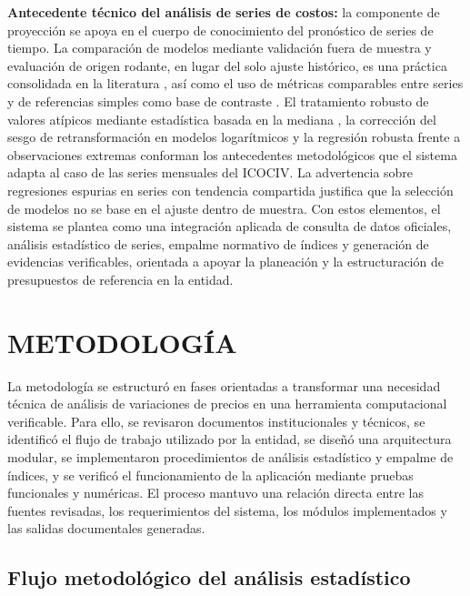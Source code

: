 \documentclass[12pt,letterpaper]{article}
\providecommand{\parencite}{\citep}
\newcommand{\ICOCIV}{ICOCIV}
\begin{document}
\textbf{Antecedente técnico del análisis de series de costos:} la componente de proyección se apoya en el cuerpo de conocimiento del pronóstico de series de tiempo. La comparación de modelos mediante validación fuera de muestra y evaluación de origen rodante, en lugar del solo ajuste histórico, es una práctica consolidada en la literatura \parencite{hyndman2021fpp3,tashman2000}, así como el uso de métricas comparables entre series y de referencias simples como base de contraste \parencite{hyndman_koehler2006}. El tratamiento robusto de valores atípicos mediante estadística basada en la mediana \parencite{nist_outliers}, la corrección del sesgo de retransformación en modelos logarítmicos \parencite{duan1983} y la regresión robusta frente a observaciones extremas \parencite{huber1964} conforman los antecedentes metodológicos que el sistema adapta al caso de las series mensuales del \ICOCIV. La advertencia sobre regresiones espurias en series con tendencia compartida \parencite{granger_newbold1974} justifica que la selección de modelos no se base en el ajuste dentro de muestra. Con estos elementos, el sistema se plantea como una integración aplicada de consulta de datos oficiales, análisis estadístico de series, empalme normativo de índices y generación de evidencias verificables, orientada a apoyar la planeación y la estructuración de presupuestos de referencia en la entidad.

\section{METODOLOGÍA}

La metodología se estructuró en fases orientadas a transformar una necesidad técnica de análisis de variaciones de precios en una herramienta computacional verificable. Para ello, se revisaron documentos institucionales y técnicos, se identificó el flujo de trabajo utilizado por la entidad, se diseñó una arquitectura modular, se implementaron procedimientos de análisis estadístico y empalme de índices, y se verificó el funcionamiento de la aplicación mediante pruebas funcionales y numéricas. El proceso mantuvo una relación directa entre las fuentes revisadas, los requerimientos del sistema, los módulos implementados y las salidas documentales generadas.

\subsection{Flujo metodológico del análisis estadístico}
\label{sec:flujo_metodologico_estadistico}
\end{document}
